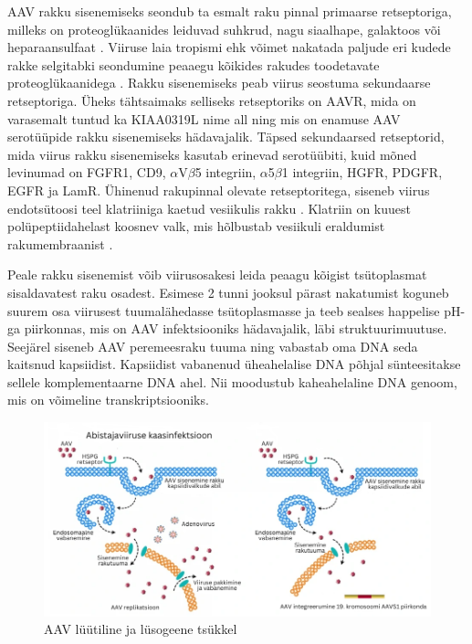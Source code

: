 \documentclass{trkut}%
\begin{document}
AAV rakku sisenemiseks seondub ta esmalt raku pinnal primaarse retseptoriga, milleks on proteoglükaanides leiduvad suhkrud, nagu siaalhape, galaktoos või heparaansulfaat \parencite{samulski}. Viiruse laia tropismi ehk võimet nakatada paljude eri kudede rakke selgitabki seondumine peaaegu kõikides rakudes toodetavate proteoglükaanidega \parencite{proteoglükaanid}. Rakku sisenemiseks peab viirus seostuma sekundaarse retseptoriga. Üheks tähtsaimaks selliseks retseptoriks on AAVR, mida on varasemalt tuntud ka KIAA0319L nime all ning mis on enamuse AAV serotüüpide rakku sisenemiseks hädavajalik. Täpsed sekundaarsed retseptorid, mida viirus rakku sisenemiseks kasutab erinevad serotüübiti, kuid mõned levinumad on FGFR1, CD9, $\alpha$V$\beta$5 integriin, $\alpha$5$\beta$1 integriin, HGFR, PDGFR, EGFR ja LamR. \parencite{pupo} Ühinenud rakupinnal olevate retseptoritega, siseneb viirus endotsütoosi teel klatriiniga kaetud vesiikulis rakku \parencite{samulski}. Klatriin on kuuest polüpeptiidahelast koosnev valk, mis hõlbustab vesiikuli eraldumist rakumembraanist \parencite{klatriin}.

Peale rakku sisenemist võib viirusosakesi leida peaagu kõigist tsütoplasmat sisaldavatest raku osadest. Esimese 2 tunni jooksul pärast nakatumist koguneb suurem osa viirusest tuumalähedasse tsütoplasmasse ja teeb sealses happelise pH-ga piirkonnas, mis on AAV infektsiooniks hädavajalik, läbi struktuurimuutuse. Seejärel siseneb AAV peremeesraku tuuma ning vabastab oma DNA seda kaitsnud kapsiidist. Kapsiidist vabanenud üheahelalise DNA põhjal sünteesitakse sellele komplementaarne DNA ahel. Nii moodustub kaheahelaline DNA genoom, mis on võimeline transkriptsiooniks. \parencite{samulski}

\begin{figure}[htbp]
	\includegraphics[width=14cm]{elu.png}
	\caption{AAV lüütiline ja lüsogeene tsükkel}
	\label{aavelu}
\end{figure}
\end{document}
